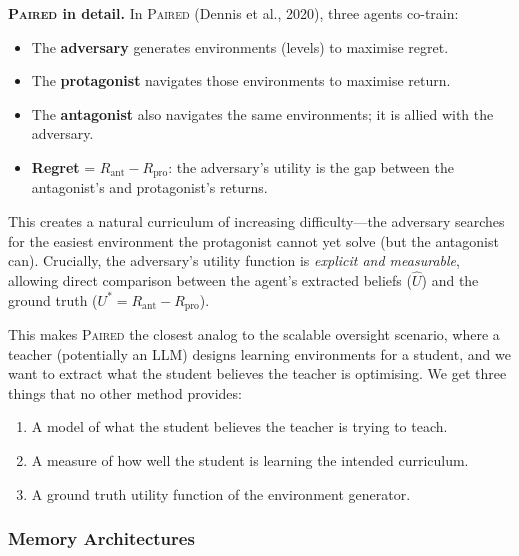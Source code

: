 \documentclass[11pt,a4paper]{article}
\theoremstyle{remark}
\newcommand{\paired}{\textsc{Paired}}
\newcommand{\Uhat}{\hat{U}}
\newcommand{\Ustar}{U^*}
\newcommand{\Rpro}{R_{\text{pro}}}
\newcommand{\Rant}{R_{\text{ant}}}
\begin{document}
\textbf{\paired{} in detail.} In \paired{} (Dennis et al., 2020), three agents co-train:
\begin{itemize}[nosep]
    \item The \textbf{adversary} generates environments (levels) to maximise regret.
    \item The \textbf{protagonist} navigates those environments to maximise return.
    \item The \textbf{antagonist} also navigates the same environments; it is allied with the adversary.
    \item \textbf{Regret} = $\Rant - \Rpro$: the adversary's utility is the gap between the antagonist's and protagonist's returns.
\end{itemize}
This creates a natural curriculum of increasing difficulty---the adversary searches for the easiest environment the protagonist cannot yet solve (but the antagonist can). Crucially, the adversary's utility function is \textit{explicit and measurable}, allowing direct comparison between the agent's extracted beliefs ($\Uhat$) and the ground truth ($\Ustar = \Rant - \Rpro$).

This makes \paired{} the closest analog to the scalable oversight scenario, where a teacher (potentially an LLM) designs learning environments for a student, and we want to extract what the student believes the teacher is optimising. We get three things that no other method provides:
\begin{enumerate}[nosep]
    \item A model of what the student believes the teacher is trying to teach.
    \item A measure of how well the student is learning the intended curriculum.
    \item A ground truth utility function of the environment generator.
\end{enumerate}

\subsubsection{Memory Architectures}
\end{document}
